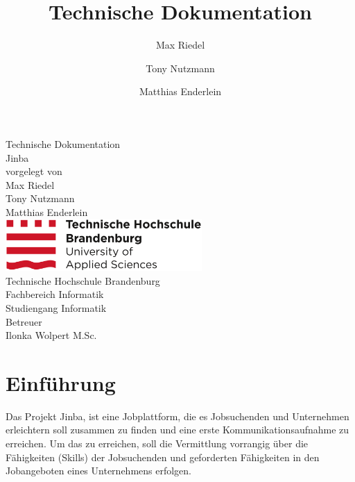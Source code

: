 \documentclass[12pt, letterpaper]{article}
\title{Technische Dokumentation}
\author{Max Riedel \and Tony Nutzmann \and Matthias Enderlein}
\begin{document}
    \begin{titlepage}
        \clearpage
        \begin{center}
        {\Large Technische Dokumentation}\\[3mm]
        {\Huge Jinba}\\[20mm]

        {vorgelegt von}\\[2mm]
        {\large Max Riedel}\\[2mm]
        {\large Tony Nutzmann}\\[2mm]
        {\large Matthias Enderlein}\\[50mm]

        \includegraphics[width=75mm]{img/Technische_Hochschule_Brandenburg_Logo.svg.png}\\[10mm]

        {Technische Hochschule Brandenburg}\\[2mm]

        {Fachbereich Informatik}\\[2mm]

        {Studiengang Informatik}\\[20mm]

        {Betreuer \\[2mm] Ilonka Wolpert M.Sc.}
        \end{center}

        \thispagestyle{empty}
    \end{titlepage}

    \begin{versionhistory}
    \end{versionhistory}
    \newpage
    \tableofcontents
    \newpage
    \section{Einführung}

    Das Projekt Jinba, ist eine Jobplattform, die es Jobsuchenden und Unternehmen
    erleichtern soll zusammen zu finden und eine erste Kommunikationsaufnahme zu erreichen.
    Um das zu erreichen, soll die Vermittlung vorrangig über die Fähigkeiten (Skills) der Jobsuchenden
    und geforderten Fähigkeiten in den Jobangeboten eines Unternehmens erfolgen.
\end{document}
